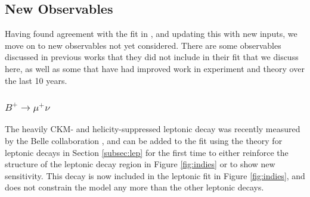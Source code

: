 \documentclass[a4paper,12pt]{article}
\begin{document}
\subsection{New Observables}
\label{sec:rdbmu}
Having found agreement with the fit in \cite{desc}, and updating this with new inputs, we move on to new observables not yet considered. 
There are some observables discussed in previous works that they did not include in their fit that we discuss here, as well as some that have had improved work in experiment and theory over the last 10 years. 

\subsubsection{$B^+\to\mu^+\nu$}
The heavily CKM- and helicity-suppressed leptonic decay was recently measured by the Belle collaboration \cite{bmu}, and can be added to the fit using the theory for leptonic decays in Section \ref{subsec:lep} for the first time to either reinforce the structure of the leptonic decay region in Figure \ref{fig:indies} or to show new sensitivity.
This decay is now included in the leptonic fit in Figure \ref{fig:indies}, and does not constrain the model any more than the other leptonic decays. 
\end{document}
